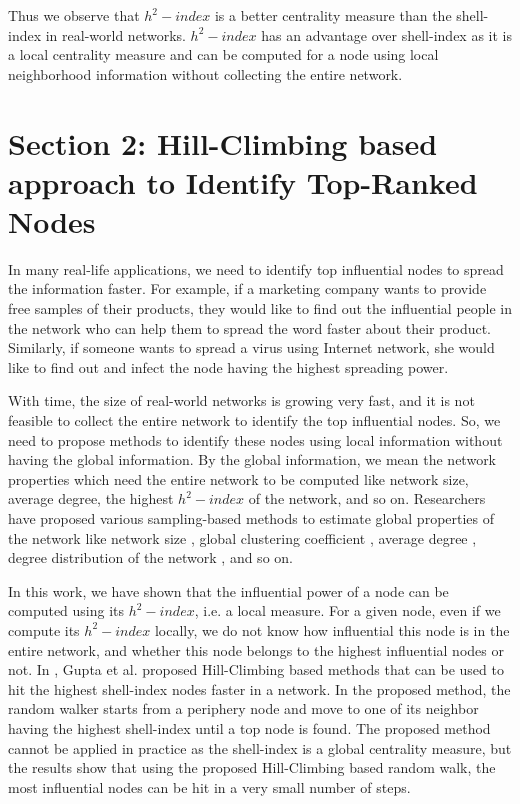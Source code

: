 \documentclass[12pt,3p]{article}
\begin{document}
Thus we observe that $h^2-index$ is a better centrality measure than the shell-index in real-world networks. $h^2-index$ has an advantage over shell-index as it is a local centrality measure and can be computed for a node using local neighborhood information without collecting the entire network.

\section{Section 2: Hill-Climbing based approach to Identify Top-Ranked Nodes}\label{sec2}

In many real-life applications, we need to identify top influential nodes to spread the information faster. For example, if a marketing company wants to provide free samples of their products, they would like to find out the influential people in the network who can help them to spread the word faster about their product. Similarly, if someone wants to spread a virus using Internet network, she would like to find out and infect the node having the highest spreading power. 

With time, the size of real-world networks is growing very fast, and it is not feasible to collect the entire network to identify the top influential nodes. So, we need to propose methods to identify these nodes using local information without having the global information. By the global information, we mean the network properties which need the entire network to be computed like network size, average degree, the highest $h^2-index$ of the network, and so on. Researchers have proposed various sampling-based methods to estimate global properties of the network like network size \cite{kurant2012graph}, global clustering coefficient \cite{hardiman2013estimating}, average degree \cite{dasgupta2014estimating}, degree distribution of the network \cite{ribeiro2012estimation}, and so on.

In this work, we have shown that the influential power of a node can be computed using its $h^2-index$, i.e. a local measure. For a given node, even if we compute its $h^2-index$ locally, we do not know how influential this node is in the entire network, and whether this node belongs to the highest influential nodes or not. In \cite{gupta2016pseudo}, Gupta et al. proposed Hill-Climbing based methods that can be used to hit the highest shell-index nodes faster in a network. In the proposed method, the random walker starts from a periphery node and move to one of its neighbor having the highest shell-index until a top node is found. The proposed method cannot be applied in practice as the shell-index is a global centrality measure, but the results show that using the proposed Hill-Climbing based random walk, the most influential nodes can be hit in a very small number of steps.  %
\end{document}

